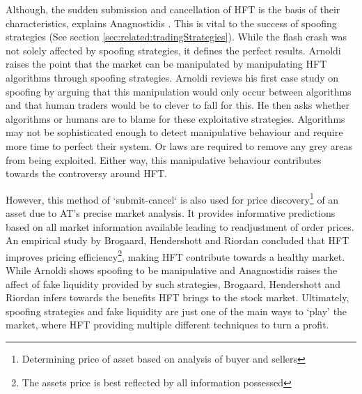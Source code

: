 Although, the sudden submission and cancellation of HFT is the basis of their characteristics, explains Anagnostidis \cite{UNPUB:Anagnostidis:2017}. This is vital to the success of spoofing strategies (See section \ref{sec:related:tradingStrategies}). While the flash crash was not solely affected by spoofing strategies, it defines the perfect results. Arnoldi \cite{JOURNAL:Arnoldi:2016} raises the point that the market can be manipulated by manipulating HFT algorithms through spoofing strategies. Arnoldi reviews his first case study on spoofing by arguing that this manipulation would only occur between algorithms and that human traders would be to clever to fall for this. He then asks whether algorithms or humans are to blame for these exploitative strategies. Algorithms may not be sophisticated enough to detect manipulative behaviour and require more time to perfect their system. Or laws are required to remove any grey areas from being exploited. Either way, this manipulative behaviour contributes towards the controversy around HFT.

However, this method of `submit-cancel` is also used for price discovery\footnote{Determining price of asset based on analysis of buyer and sellers} of an asset due to AT's precise market analysis. It provides informative predictions based on all market information available leading to readjustment of order prices. An empirical study by Brogaard, Hendershott and Riordan \cite{UNPUB:Brogaard:2017} concluded that HFT improves pricing efficiency\footnote{The assets price is best reflected by all information possessed}, making HFT contribute towards a healthy market. While Arnoldi \cite{JOURNAL:Arnoldi:2016} shows spoofing to be manipulative and Anagnostidis \cite{UNPUB:Anagnostidis:2017} raises the affect of fake liquidity provided by such strategies, Brogaard, Hendershott and Riordan \cite{UNPUB:Brogaard:2017} infers towards the benefits HFT brings to the stock market. Ultimately, spoofing strategies and fake liquidity are just one of the main ways to `play' the market, where HFT providing multiple different techniques to turn a profit. 

